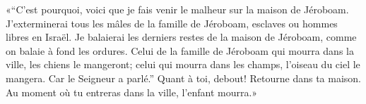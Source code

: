 «“C’est pourquoi, voici que je fais venir le malheur sur la maison de Jéroboam.
J’exterminerai tous les mâles de la famille de Jéroboam,
	esclaves ou hommes libres en Israël.
Je balaierai les derniers restes de la maison de Jéroboam,
	comme on balaie à fond les ordures.
Celui de la famille de Jéroboam qui mourra dans la ville, les chiens le mangeront;
	celui qui mourra dans les champs, l’oiseau du ciel le mangera.
	Car le Seigneur a parlé.”
Quant à toi, debout! Retourne dans ta maison.
	Au moment où tu entreras dans la ville, l’enfant mourra.»

